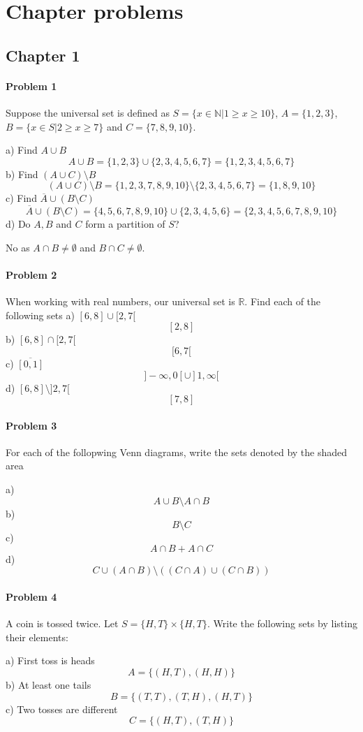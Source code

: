 \appendix
\section{Chapter problems}
\subsection{Chapter 1}
\paragraph{Problem 1}
Suppose the universal set is defined as $S=\{x\in \mathbb{N} | 1\geq x \geq 10\}$, $A=\{1,2,3\}$, $B=\{x\in S|2\geq x\geq 7\}$ and $C=\{7,8,9,10\}$.

a) Find $A\cup B$
\[
    A\cup B=\{1,2,3\}\cup\{2,3,4,5,6,7\}=\{1,2,3,4,5,6,7\}
\]
b) Find $(A\cup C)\setminus B$
\[
    (A\cup C)\setminus B=\{1,2,3,7,8,9,10\}\setminus \{2,3,4,5,6,7\}=\{1,8,9,10\}
\]
c) Find $\overline{A}\cup(B\setminus C)$
\[
    \overline{A}\cup(B\setminus C)=\{4,5,6,7,8,9,10\}\cup\{2,3,4,5,6\}=\{2,3,4,5,6,7,8,9,10\}
\]
d) Do $A,B$ and $C$ form a partition of $S$?

No as $A\cap B\neq\emptyset$ and $B\cap C\neq\emptyset$.
\paragraph{Problem 2}
When working with real numbers, our universal set is $\mathbb{R}$. Find each of the following sets
a) $[6,8]\cup[2,7[$
\[
    [2,8]
\]
b) $[6,8]\cap[2,7[$
\[
    [6,7[
\]
c) $\overline{[0,1]}$
\[
    ]-\infty,0[\cup]1,\infty[
\]
d) $[6,8]\setminus ]2,7[$
\[
    [7,8]
\]
\paragraph{Problem 3}
For each of the follopwing Venn diagrams, write the sets denoted by the shaded area

a)
\[
    A\cup B\setminus A\cap B
\]
b)
\[
    B\setminus C
\]
c)
\[
    A\cap B+A\cap C
\]
d)
\[
    C\cup(A\cap B)\setminus ((C\cap A)\cup (C\cap B))
\]
\paragraph{Problem 4}
A coin is tossed twice. Let $S=\{H,T\}\times\{H,T\}$. Write the following sets by listing their elements:

a) First toss is heads
\[
    A=\{(H,T),(H,H)\}
\]
b) At least one tails
\[
    B=\{(T,T),(T,H),(H,T)\}
\]
c) Two tosses are different
\[
    C=\{(H,T),(T,H)\}
\]
